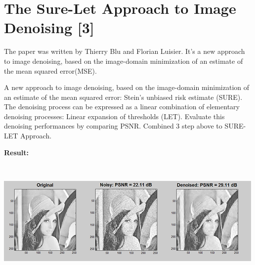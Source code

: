 \section{The Sure-Let Approach to Image Denoising [3]}

The paper was written by Thierry Blu and Florian Luisier. It's a new approach to image denoising, based on the image-domain minimization of an estimate of the mean squared error(MSE).
\vspace{0.5cm}


A new approach to image denoising, based on the image-domain minimization of an estimate of the mean squared error: Stein’s unbiased risk estimate (SURE). The denoising process can be expressed as a linear combination of elementary denoising processes: Linear expansion of thresholds (LET). Evaluate this denoising performances by comparing PSNR. Combined 3 step above to  SURE-LET Approach.
\vspace{1cm}




	


\textbf{Result:}

\

\includegraphics{surelet1.png}

